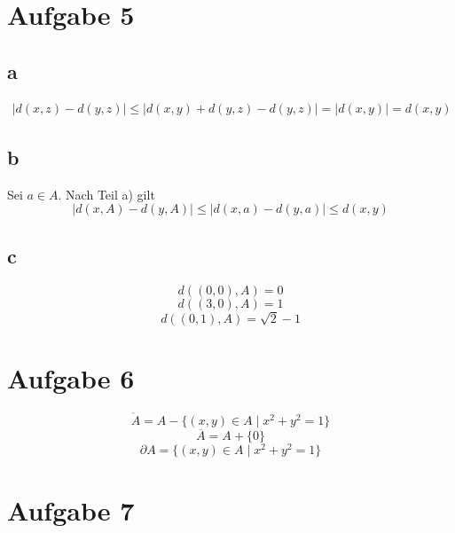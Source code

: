 \documentclass[10pt,a4paper]{article}
\begin{document}
\section*{Aufgabe 5}

\subsection*{a}

\begin{align}
|d(x, z) - d(y, z)| \le |d(x, y) + d(y, z) - d(y, z)| = |d(x, y)| = d(x, y)
\end{align}

\subsection*{b}

Sei $a \in A$.
Nach Teil a) gilt
\begin{equation}
|d(x, A) - d(y, A)| \le |d(x, a) - d(y, a)| \le d(x, y)
\end{equation}

\subsection*{c}

\begin{equation}
d((0, 0), A) = 0
\end{equation}
\begin{equation}
d((3, 0), A) = 1
\end{equation}
\begin{equation}
d((0, 1), A) = \sqrt{2} - 1
\end{equation}

\section*{Aufgabe 6}

\begin{equation}
\mathring{A} = A - \{(x, y) \in A \mid x^{2} + y^{2} = 1\}
\end{equation}
\begin{equation}
\overline{A} = A + \{0\}
\end{equation}
\begin{equation}
\partial A = \{(x, y) \in A \mid x^{2} + y^{2} = 1\}
\end{equation}

\section*{Aufgabe 7}
\end{document}
